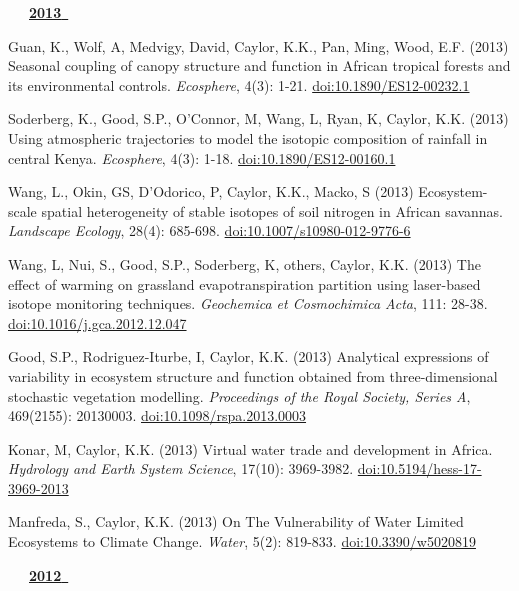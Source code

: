\begin{etaremune}
\mbox{\ \ \ \underline{\textbf{2013 }}}

\item Guan, K., Wolf, A, Medvigy, David, Caylor, K.K., Pan, Ming, Wood, E.F. (2013) Seasonal coupling of canopy structure and function in African tropical forests and its environmental controls. \emph{Ecosphere}, 4(3): 1-21. \href{https://doi.org/10.1890/ES12-00232.1}{doi:10.1890/ES12-00232.1}
\item Soderberg, K., Good, S.P., O'Connor, M, Wang, L, Ryan, K, Caylor, K.K. (2013) Using atmospheric trajectories to model the isotopic composition of rainfall in central Kenya. \emph{Ecosphere}, 4(3): 1-18. \href{https://doi.org/10.1890/ES12-00160.1}{doi:10.1890/ES12-00160.1}
\item Wang, L., Okin, GS, D'Odorico, P, Caylor, K.K., Macko, S (2013) Ecosystem-scale spatial heterogeneity of stable isotopes of soil nitrogen in African savannas. \emph{Landscape Ecology}, 28(4): 685-698. \href{https://doi.org/10.1007/s10980-012-9776-6}{doi:10.1007/s10980-012-9776-6}
\item Wang, L, Nui, S., Good, S.P., Soderberg, K, others, Caylor, K.K. (2013) The effect of warming on grassland evapotranspiration partition using laser-based isotope monitoring techniques. \emph{Geochemica et Cosmochimica Acta}, 111: 28-38. \href{https://doi.org/10.1016/j.gca.2012.12.047}{doi:10.1016/j.gca.2012.12.047}
\item Good, S.P., Rodriguez-Iturbe, I, Caylor, K.K. (2013) Analytical expressions of variability in ecosystem structure and function obtained from three-dimensional stochastic vegetation modelling. \emph{Proceedings of the Royal Society, Series A}, 469(2155): 20130003. \href{https://doi.org/10.1098/rspa.2013.0003}{doi:10.1098/rspa.2013.0003}
\item Konar, M, Caylor, K.K. (2013) Virtual water trade and development in Africa. \emph{Hydrology and Earth System Science}, 17(10): 3969-3982. \href{https://doi.org/10.5194/hess-17-3969-2013}{doi:10.5194/hess-17-3969-2013}
\item Manfreda, S., Caylor, K.K. (2013) On The Vulnerability of Water Limited Ecosystems to Climate Change. \emph{Water}, 5(2): 819-833. \href{https://doi.org/10.3390/w5020819}{doi:10.3390/w5020819}

\mbox{\ \ \ \underline{\textbf{2012 }}}


\end{etaremune}
